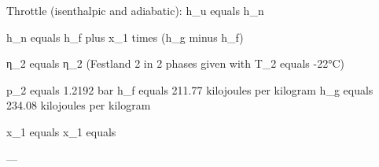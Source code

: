 Throttle (isenthalpic and adiabatic):  
h_u equals h_n  

h_n equals h_f plus x_1 times (h_g minus h_f)  

η_2 equals η_2 (Festland 2 in 2 phases given with T_2 equals -22°C)  

p_2 equals 1.2192 bar  
h_f equals 211.77 kilojoules per kilogram  
h_g equals 234.08 kilojoules per kilogram  

x_1 equals x_1 equals  

---